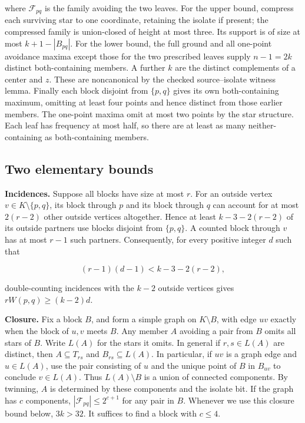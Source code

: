 \documentclass[
  11pt,
]{article}
\begin{document}
where \(\mathcal{F}_{pq}\) is the family avoiding the two leaves. For
the upper bound, compress each surviving star to one coordinate,
retaining the isolate if present; the compressed family is union-closed
of height at most three. Its support is of size at most
\(k+1-|B_{pq}|\). For the lower bound, the full ground and all one-point
avoidance maxima except those for the two prescribed leaves supply
\(n-1=2k\) distinct both-containing members. A further \(k\) are the
distinct complements of a center and \(z\). These are noncanonical by
the checked source--isolate witness lemma. Finally each block disjoint
from \(\{p,q\}\) gives its own both-containing maximum, omitting at
least four points and hence distinct from those earlier members. The
one-point maxima omit at most two points by the star structure. Each
leaf has frequency at most half, so there are at least as many
neither-containing as both-containing members.

\subsection{Two elementary bounds}\label{two-elementary-bounds}

\textbf{Incidences.} Suppose all blocks have size at most \(r\). For an
outside vertex \(v\in K\setminus\{p,q\}\), its block through \(p\) and
its block through \(q\) can account for at most \(2(r-2)\) other outside
vertices altogether. Hence at least \(k-3-2(r-2)\) of its outside
partners use blocks disjoint from \(\{p,q\}\). A counted block through
\(v\) has at most \(r-1\) such partners. Consequently, for every
positive integer \(d\) such that

\[
   (r-1)(d-1)<k-3-2(r-2),
\]

double-counting incidences with the \(k-2\) outside vertices gives
\(rW(p,q)\ge (k-2)d\).

\textbf{Closure.} Fix a block \(B\), and form a simple graph on
\(K\setminus B\), with edge \(uv\) exactly when the block of \(u,v\)
meets \(B\). Any member \(A\) avoiding a pair from \(B\) omits all stars
of \(B\). Write \(L(A)\) for the stars it omits. In general if
\(r,s\in L(A)\) are distinct, then \(A\subseteq T_{rs}\) and
\(B_{rs}\subseteq L(A)\). In particular, if \(uv\) is a graph edge and
\(u\in L(A)\), use the pair consisting of \(u\) and the unique point of
\(B\) in \(B_{uv}\) to conclude \(v\in L(A)\). Thus \(L(A)\setminus B\)
is a union of connected components. By twinning, \(A\) is determined by
these components and the isolate bit. If the graph has \(c\) components,
\(|\mathcal{F}_{pq}|\le 2^{c+1}\) for any pair in \(B\). Whenever we use
this closure bound below, \(3k>32\). It suffices to find a block with
\(c\le 4\).
\end{document}
